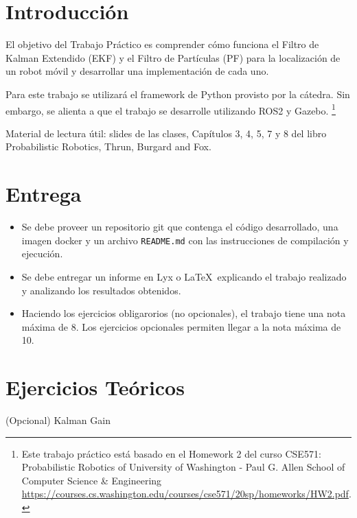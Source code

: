 \documentclass[tp]{lcc}
\begin{document}
	\maketitle
	
	
	\section{Introducción}
	
	El objetivo del Trabajo Práctico es comprender cómo funciona el Filtro de Kalman Extendido (EKF) y el Filtro de Partículas (PF) para la localización de un robot móvil y desarrollar una implementación de cada uno.
	
	Para este trabajo se utilizará el framework de Python provisto por la cátedra. Sin embargo, se alienta a que el trabajo se desarrolle utilizando ROS2 y Gazebo. \footnote{Este trabajo práctico está basado en el Homework 2 del curso CSE571: Probabilistic Robotics of University of Washington - Paul G. Allen School of Computer Science \& Engineering \url{https://courses.cs.washington.edu/courses/cse571/20sp/homeworks/HW2.pdf}.}
	
	Material de lectura útil: slides de las clases, Capítulos 3, 4, 5, 7 y 8 del libro Probabilistic Robotics, Thrun, Burgard and Fox.
	
	
	\section{Entrega}
	\begin{itemize}
		\item Se debe proveer un repositorio git que contenga el código desarrollado, una imagen docker y un archivo \lstinline{README.md} con las instrucciones de compilación y ejecución.
		
		\item Se debe entregar un informe en Lyx o \LaTeX\  explicando el trabajo realizado y analizando los resultados obtenidos.
		
		\item Haciendo los ejercicios obligarorios (no opcionales), el trabajo tiene una nota máxima de 8. Los ejercicios opcionales permiten llegar a la nota máxima de 10.
	\end{itemize}

	
	\section{Ejercicios Teóricos}
    
    \ejercicio (Opcional) Kalman Gain
    
\end{document}
